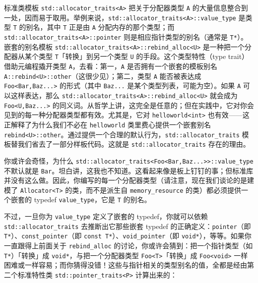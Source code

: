 标准类模板 \texttt{std::\allowbreak{}allocator\_\allowbreak{}traits<\allowbreak{}A>\allowbreak{}} 把关于分配器类型 \texttt{A} 的大量信息整合到一处，因而易于取用。举例来说，\texttt{std::\allowbreak{}allocator\_\allowbreak{}traits<\allowbreak{}A>\allowbreak{}::\allowbreak{}value\_\allowbreak{}type} 是类型 \texttt{T} 的别名，其中 \texttt{T} 正是由 \texttt{A} 分配内存的那个类型；而 \texttt{std::\allowbreak{}allocator\_\allowbreak{}traits<\allowbreak{}A>\allowbreak{}::\allowbreak{}pointer} 则是相应指针类型的别名（通常是 \texttt{T*}）。嵌套的别名模板 \texttt{std::\allowbreak{}allocator\_\allowbreak{}traits<\allowbreak{}A>\allowbreak{}::\allowbreak{}rebind\_\allowbreak{}alloc<\allowbreak{}U>\allowbreak{}} 是一种把一个分配器从某个类型 \texttt{T}「转换」到另一个类型 \texttt{U} 的手段。这个类型特性（type trait）借助元编程撬开类型 \texttt{A}，去看：第一，\texttt{A} 是否拥有一个嵌套的模板别名 \texttt{A::\allowbreak{}rebind<\allowbreak{}U>\allowbreak{}::\allowbreak{}other}（这很少见）；第二，类型 \texttt{A} 能否被表达成 \texttt{Foo<\allowbreak{}Bar,\allowbreak{}Baz...>} 的形式（其中 \texttt{Baz...} 是某个类型列表，可能为空）。如果 \texttt{A} 可以这样表达，那么 \texttt{std::\allowbreak{}allocator\_\allowbreak{}traits<\allowbreak{}A>\allowbreak{}::\allowbreak{}rebind\_\allowbreak{}alloc<\allowbreak{}U>\allowbreak{}} 就会成为 \texttt{Foo<\allowbreak{}U,\allowbreak{}Baz...>} 的同义词。从哲学上讲，这完全是任意的；但在实践中，它对你会见到的每一种分配器类型都有效。尤其是，它对 \texttt{helloworld<\allowbreak{}int>\allowbreak{}} 也有效——这正解释了为什么我们不必在 \texttt{helloworld} 类里费心提供一个嵌套别名 \texttt{rebind<\allowbreak{}U>\allowbreak{}::\allowbreak{}other}。通过提供一个合理的默认行为，\texttt{std::\allowbreak{}allocator\_\allowbreak{}traits} 模板替我们省去了一部分样板代码。这就是 \texttt{std::\allowbreak{}allocator\_\allowbreak{}traits} 存在的理由。

你或许会奇怪，为什么 \texttt{std::\allowbreak{}allocator\_\allowbreak{}traits<\allowbreak{}Foo<\allowbreak{}Bar,\allowbreak{}Baz...>>::\allowbreak{}value\_\allowbreak{}type} 不默认就是 \texttt{Bar}。坦白讲，这我也不知道。这看起来像是板上钉钉的事；但标准库并没有这么做。因此，你编写的每一个分配器类型（请注意，现在我们谈论的是建模了 \texttt{Allocator<\allowbreak{}T>\allowbreak{}} 的类，而不是派生自 \texttt{memory\_\allowbreak{}resource} 的类）都必须提供一个嵌套的 typedef \texttt{value\_\allowbreak{}type}，它是 \texttt{T} 的别名。

不过，一旦你为 \texttt{value\_\allowbreak{}type} 定义了嵌套的 typedef，你就可以依赖 \texttt{std::\allowbreak{}allocator\_\allowbreak{}traits} 去推断出它那些嵌套 typedef 的正确定义：\texttt{pointer}（即 \texttt{T*}）、\texttt{const\_\allowbreak{}pointer}（即 \texttt{const T*}）、\texttt{void\_\allowbreak{}pointer}（即 \texttt{void*}），等等。如果你一直跟得上前面关于 \texttt{rebind\_\allowbreak{}alloc} 的讨论，你或许会猜到：把一个指针类型（如 \texttt{T*}）「转换」成 \texttt{void*}，与把一个分配器类型 \texttt{Foo<\allowbreak{}T>\allowbreak{}}「转换」成 \texttt{Foo<\allowbreak{}void>\allowbreak{}} 一样困难或一样容易；而你猜得没错！这些与指针相关的类型别名的值，全都是经由第二个标准特性类 \texttt{std::\allowbreak{}pointer\_\allowbreak{}traits<\allowbreak{}P>\allowbreak{}} 计算出来的：

